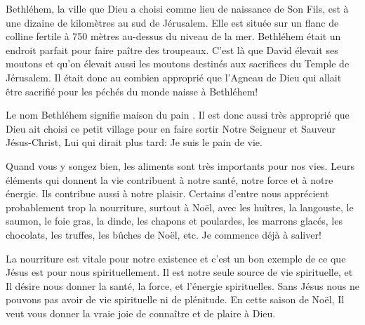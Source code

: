 


Bethléhem, la ville que Dieu a choisi comme lieu de naissance de Son Fils, est à une dizaine de kilomètres au sud de Jérusalem. Elle est située sur un flanc de colline fertile à 750 mètres au-dessus du niveau de la mer. Bethléhem était un endroit parfait pour faire paître des troupeaux. C'est là que David élevait ses moutons et qu'on élevait aussi les moutons destinés aux sacrifices du Temple de Jérusalem. Il était donc au combien approprié que l'Agneau de Dieu qui allait être sacrifié pour les péchés du monde naisse à Bethléhem!

Le nom Bethléhem signifie \og maison du pain \fg{}. Il est donc aussi très approprié que Dieu ait choisi ce petit village pour en faire sortir Notre Seigneur et Sauveur Jésus-Christ, Lui qui dirait plus tard: \og Je suis le pain de vie. \fg{}

Quand vous y songez bien, les aliments sont très importants pour nos vies. Leurs éléments qui donnent la vie contribuent à notre santé, notre force et à notre énergie. Ils contribue aussi à notre plaisir. Certains d'entre nous apprécient probablement trop la nourriture, surtout à Noël, avec les huîtres, la langouste, le saumon, le foie gras, la dinde, les chapons et poulardes, les marrons glacés, les chocolats, les truffes, les bûches de Noël, etc. Je commence déjà à saliver!

La nourriture est vitale pour notre existence et c'est un bon exem\-ple de ce que Jésus est pour nous spirituellement. Il est notre seule source de vie spirituelle, et Il désire nous donner la santé, la force, et l'énergie spirituelles. Sans Jésus nous ne pouvons pas avoir de vie spirituelle ni de plénitude. En cette saison de Noël, Il veut vous donner la vraie joie de connaître et de plaire à Dieu.


\ornrule


